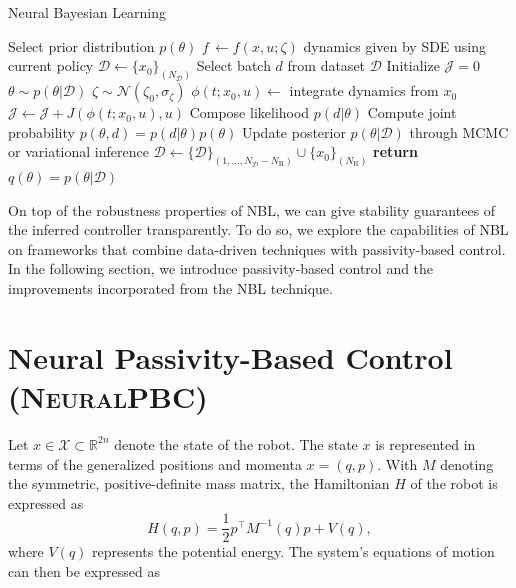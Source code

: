 \begin{algorithm}[tb]
    \centering
    \caption{Neural Bayesian Learning}\label{algo:nbl}
    \begin{algorithmic}[1]
      \algrenewcommand\algorithmicindent{0em} %
      \State Select prior distribution $p(\theta)$
      \State $f \,\gets f(x, u; \zeta)$ dynamics given by SDE using current policy
      \State $\mathcal{D} \gets \{x_0\}_{(N_{\mathcal{D}})}$  
      \algrenewcommand\algorithmicindent{1.5em} %
           \Comment Select batch $d$ from dataset $\mathcal{D}$
              \State Initialize $\mathcal{J} = 0$
              \State $\theta \sim p(\theta | \mathcal{D})$ 
                  \State $\zeta \sim \mathcal{N}(\zeta_0,\sigma_{\zeta})$ 
                  \State $\phi(t; x_0, u) \gets$ integrate dynamics from $x_0$ 
                  \State $\mathcal{J} \gets \mathcal{J} + J(\phi(t; x_0, u), u)$
              \EndFor
          \State Compose likelihood $p(d | \theta)$
          \State Compute joint probability $p(\theta,d) = p(d | \theta) p(\theta)$
          \State Update posterior $p(\theta|\mathcal{D})$ through MCMC or variational inference
          \EndFor
        \State $\mathcal{D} \gets \{\mathcal{D}\}_{(1,\ldots,N_{\mathcal{D}}-N_{\textrm{R}})} \cup \{x_0\}_{(N_{\textrm{R}})}$
      \EndFor
      \State \textbf{return} $q(\theta) = p(\theta|\mathcal{D})$
      \EndProcedure
    \end{algorithmic}
\end{algorithm}

On top of the robustness properties of NBL, we can give stability guarantees of
the inferred controller transparently. To do so, we explore the capabilities of
NBL on frameworks that combine data-driven techniques with passivity-based
control. In the following section, we introduce passivity-based control and the
improvements incorporated from the NBL technique.


\section{Neural Passivity-Based Control (\textsc{NeuralPBC})}
\label{sec:ml-pbc-bayes}
Let $x \in \mathcal{X} \subset \mathbb{R}^{2n}$ denote the state of the robot.
%
The state $x$ is represented in terms of the generalized positions and momenta
$x = (q, p)$. 
%
With $M$ denoting the symmetric, positive-definite mass matrix, the Hamiltonian
$H$ of the robot is expressed as 
%
\begin{equation}
    H(q,p) = \frac{1}{2} p^\top M^{-1}(q) p + V(q),
    \label{eq:system_hamiltonian}
\end{equation}
%
where $V(q)$ represents the potential energy. The system's equations of motion
can then be expressed as 

